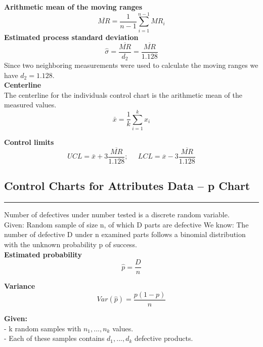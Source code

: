 \textbf{Arithmetic mean of the moving ranges}
\begin{equation}
  \overline{MR} = \frac{1}{n-1} \sum_{i=1}^{n-1}MR_i
\end{equation}
\textbf{Estimated process standard deviation}
\begin{equation}
  \hat{\sigma} = \frac{\overline{MR}}{d_2} = \frac{\overline{MR}}{1.128}
\end{equation}
Since two neighboring measurements were used to calculate the moving ranges we have $d_2 = 1.128$.\\

\textbf{Centerline}\\
The centerline for the individuals control chart is the arithmetic mean of the measured values.
\begin{equation}
  \bar{x} = \frac{1}{k} \sum^k_{i=1} x_i
\end{equation}

\textbf{Control limits}
\begin{equation}
    UCL = \bar{x} + 3 \frac{\overline{MR}}{1.128}; \;\;\;\;\; LCL = \overline{x} - 3 \frac{\overline{MR}}{1.128}
\end{equation}

\subsection{Control Charts for Attributes Data – p Chart}
\noindent\rule[\linienAbstand]{\linewidth}{\linienDicke}
Number of defectives under number tested is a discrete random variable.\\

Given: Random sample of size n, of which D parts are defective
We know: The number of defective D under n examined parts follows a binomial distribution with the unknown probability p of success.\\

\textbf{Estimated probability}
\begin{equation}
  \hat{p} = \frac{D}{n}
\end{equation}

\textbf{Variance}
\begin{equation}
  Var(\hat{p}) = \frac{p(1-p)}{n}
\end{equation}

\textbf{Given:}\\
 - k random samples with $n_1,...,n_k$ values.\\
 - Each of these samples contains $d_1,...,d_k$ defective products.\\

